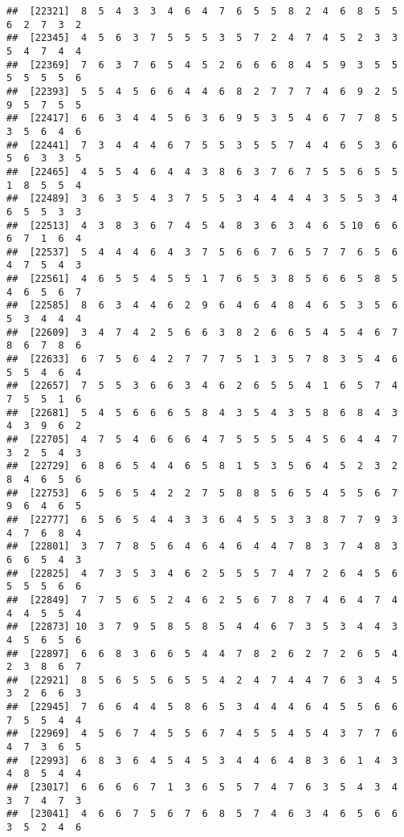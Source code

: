 \documentclass[
]{book}
\begin{document}
\begin{verbatim}
##  [22321]  8  5  4  3  3  4  6  4  7  6  5  5  8  2  4  6  8  5  5  6  2  7  3  2
##  [22345]  4  5  6  3  7  5  5  5  3  5  7  2  4  7  4  5  2  3  3  5  4  7  4  4
##  [22369]  7  6  3  7  6  5  4  5  2  6  6  6  8  4  5  9  3  5  5  5  5  5  5  6
##  [22393]  5  5  4  5  6  6  4  4  6  8  2  7  7  7  4  6  9  2  5  9  5  7  5  5
##  [22417]  6  6  3  4  4  5  6  3  6  9  5  3  5  4  6  7  7  8  5  3  5  6  4  6
##  [22441]  7  3  4  4  4  6  7  5  5  3  5  5  7  4  4  6  5  3  6  5  6  3  3  5
##  [22465]  4  5  5  4  6  4  4  3  8  6  3  7  6  7  5  5  6  5  5  1  8  5  5  4
##  [22489]  3  6  3  5  4  3  7  5  5  3  4  4  4  4  3  5  5  3  4  6  5  5  3  3
##  [22513]  4  3  8  3  6  7  4  5  4  8  3  6  3  4  6  5 10  6  6  6  7  1  6  4
##  [22537]  5  4  4  4  6  4  3  7  5  6  6  7  6  5  7  7  6  5  6  4  7  5  4  3
##  [22561]  4  6  5  5  4  5  5  1  7  6  5  3  8  5  6  6  5  8  5  4  6  5  6  7
##  [22585]  8  6  3  4  4  6  2  9  6  4  6  4  8  4  6  5  3  5  6  5  3  4  4  4
##  [22609]  3  4  7  4  2  5  6  6  3  8  2  6  6  5  4  5  4  6  7  8  6  7  8  6
##  [22633]  6  7  5  6  4  2  7  7  7  5  1  3  5  7  8  3  5  4  6  5  5  4  6  4
##  [22657]  7  5  5  3  6  6  3  4  6  2  6  5  5  4  1  6  5  7  4  7  5  5  1  6
##  [22681]  5  4  5  6  6  6  5  8  4  3  5  4  3  5  8  6  8  4  3  4  3  9  6  2
##  [22705]  4  7  5  4  6  6  6  4  7  5  5  5  5  4  5  6  4  4  7  3  2  5  4  3
##  [22729]  6  8  6  5  4  4  6  5  8  1  5  3  5  6  4  5  2  3  2  8  4  6  5  6
##  [22753]  6  5  6  5  4  2  2  7  5  8  8  5  6  5  4  5  5  6  7  9  6  4  6  5
##  [22777]  6  5  6  5  4  4  3  3  6  4  5  5  3  3  8  7  7  9  3  4  7  6  8  4
##  [22801]  3  7  7  8  5  6  4  6  4  6  4  4  7  8  3  7  4  8  3  6  6  5  4  3
##  [22825]  4  7  3  5  3  4  6  2  5  5  5  7  4  7  2  6  4  5  6  5  5  5  6  6
##  [22849]  7  7  5  6  5  2  4  6  2  5  6  7  8  7  4  6  4  7  4  4  4  5  5  4
##  [22873] 10  3  7  9  5  8  5  8  5  4  4  6  7  3  5  3  4  4  3  4  5  6  5  6
##  [22897]  6  6  8  3  6  6  5  4  4  7  8  2  6  2  7  2  6  5  4  2  3  8  6  7
##  [22921]  8  5  6  5  5  6  5  5  4  2  4  7  4  4  7  6  3  4  5  3  2  6  6  3
##  [22945]  7  6  6  4  4  5  8  6  5  3  4  4  4  6  4  5  5  6  6  7  5  5  4  4
##  [22969]  4  5  6  7  4  5  5  6  7  4  5  5  4  5  4  3  7  7  6  4  7  3  6  5
##  [22993]  6  8  3  6  4  5  4  5  3  4  4  6  4  8  3  6  1  4  3  4  8  5  4  4
##  [23017]  6  6  6  6  7  1  3  6  5  5  7  4  7  6  3  5  4  3  4  3  7  4  7  3
##  [23041]  4  6  6  7  5  6  7  6  8  5  7  4  6  3  4  6  5  6  6  3  5  2  4  6

\end{verbatim}
\end{document}
